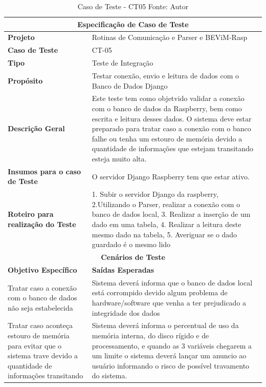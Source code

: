 \begin{table}[H]
    \begin{center}
        \begin{tabular}{|p{5cm}|p{12cm}|}
            \hline
            \multicolumn{2}{|c|}{\textbf{Especificação de Caso de Teste}} \\ \hline
                \textbf{Projeto}                                        & Rotinas de Comunicação e Parser e BEViM-Rasp\\ \hline
                \textbf{Caso de Teste}                             & CT-05 \\ \hline
                \textbf{Tipo}                                             & Teste de Integração \\ \hline
                \textbf{Propósito}                                     & Testar conexão, envio e leitura de dados com o Banco de Dados Django \\ \hline
                \textbf{Descrição Geral}                           & Este teste tem como objetvido validar a conexão com o banco de dados da Raspberry, bem como escrita e leitura desses dados. O sistema deve estar preparado para tratar caso a conexão com o banco falhe ou tenha um estouro de memória devido a quantidade de informações que estejam transitando esteja muito alta. \\ \hline
                \textbf{Insumos para o caso de Teste}    & O servidor Django Raspberry tem que estar ativo. \\ \hline
                \textbf{Roteiro para realização do Teste}&  1. Subir o servidor Django da raspberry, 2.Utilizando o Parser, realizar a conexão com o banco de dados local, 3. Realizar a inserção de um dado em uma tabela, 4. Realizar a leitura deste mesmo dado na tabela, 5. Averiguar se o dado guardado é o mesmo lido  \\ \hline
            \multicolumn{2}{|c|}{\textbf{Cenários de Teste}} \\ \hline
                \textbf{Objetivo Específico}                      & \textbf{Saídas Esperadas} \\ \hline
                Tratar caso a conexão com o banco de dados não seja estabelecida & Sistema deverá informa que o banco de dados local está corrompido devido algum problema de hardware/software que venha a ter prejudicado a integridade dos dados \\ \hline
                Tratar caso aconteça estouro de memória para evitar que o sistema trave devido a quantidade de informações transitando & Sistema deverá informa o percentual de uso da memória interna, do disco rígido e de processamento, e quando as 3 variáveis chegarem a um limite o sistema deverá lançar um anuncio ao usuário informando o risco de possível travamento do sistema. \\ \hline
        \end{tabular}
    \end{center}
    \caption[Caso de Teste - CT05]{Caso de Teste - CT05
    \protect Fonte: Autor}
    \label{CT-05}
\end{table}

